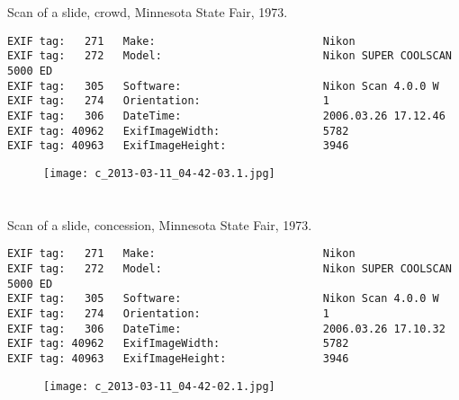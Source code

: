 \section{\protect{}}
\noindent Scan of a slide, crowd, Minnesota State Fair, 1973.
\noindent
\begin{lstlisting}
EXIF tag:   271   Make:                          Nikon
EXIF tag:   272   Model:                         Nikon SUPER COOLSCAN 5000 ED
EXIF tag:   305   Software:                      Nikon Scan 4.0.0 W
EXIF tag:   274   Orientation:                   1
EXIF tag:   306   DateTime:                      2006.03.26 17.12.46
EXIF tag: 40962   ExifImageWidth:                5782
EXIF tag: 40963   ExifImageHeight:               3946

\end{lstlisting}
\clearpage
\begin{figure}
\raggedleft
\texttt{[image: c\_2013-03-11\_04-42-03.1.jpg]}
\end{figure}


\clearpage
\section{\protect{}}
\noindent Scan of a slide, concession, Minnesota State Fair, 1973.
\noindent
\begin{lstlisting}
EXIF tag:   271   Make:                          Nikon
EXIF tag:   272   Model:                         Nikon SUPER COOLSCAN 5000 ED
EXIF tag:   305   Software:                      Nikon Scan 4.0.0 W
EXIF tag:   274   Orientation:                   1
EXIF tag:   306   DateTime:                      2006.03.26 17.10.32
EXIF tag: 40962   ExifImageWidth:                5782
EXIF tag: 40963   ExifImageHeight:               3946

\end{lstlisting}
\clearpage
\begin{figure}
\raggedleft
\texttt{[image: c\_2013-03-11\_04-42-02.1.jpg]}
\end{figure}


\clearpage
